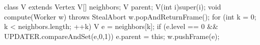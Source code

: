 class V  extends Vertex {
   V[] neighbors;
   V parent;
   V(int i){super(i);}
   void compute(Worker w) throws StealAbort {
     w.popAndReturnFrame();
     for (int k = 0; k < neighbors.length; ++k) {
       V e = neighbors[k];
       if (e.level == 0 &&
           UPDATER.compareAndSet(e,0,1)) {
         e.parent = this;
         w.pushFrame(e);
       }
     }
   }
}
    

